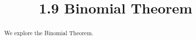 \documentclass[handout]{ximera}
\title{1.9 Binomial Theorem}
\begin{document}
\begin{abstract}
We explore the Binomial Theorem.
\end{abstract}

\maketitle
\end{document}
